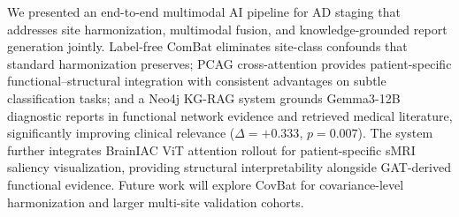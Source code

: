 \documentclass[conference]{IEEEtran}
\begin{document}
We presented an end-to-end multimodal AI pipeline for AD staging that addresses site harmonization, multimodal fusion, and knowledge-grounded report generation jointly. Label-free ComBat eliminates site-class confounds that standard harmonization preserves; PCAG cross-attention provides patient-specific functional--structural integration with consistent advantages on subtle classification tasks; and a Neo4j KG-RAG system grounds Gemma3-12B diagnostic reports in functional network evidence and retrieved medical literature, significantly improving clinical relevance ($\Delta{=}{+}0.333$, $p{=}0.007$). The system further integrates BrainIAC ViT attention rollout for patient-specific sMRI saliency visualization, providing structural interpretability alongside GAT-derived functional evidence. Future work will explore CovBat for covariance-level harmonization and larger multi-site validation cohorts.
\end{document}
